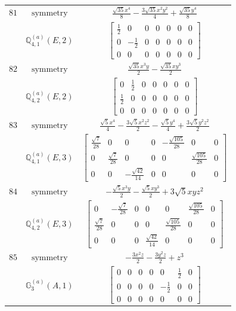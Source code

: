 \documentclass[fleqn,8pt,landscape]{jsarticle}
\begin{document}
\begin{longtable}{ccc}
$ 81 $ & $ \text{symmetry} $ & $ \frac{\sqrt{35} x^{4}}{8} - \frac{3 \sqrt{35} x^{2} y^{2}}{4} + \frac{\sqrt{35} y^{4}}{8} $ \\
$  $ & $ \mathbb{Q}_{4,1}^{(a)}(E,2) $ & $ \begin{bmatrix} \frac{1}{2} & 0 & 0 & 0 & 0 & 0 & 0 \\ 0 & - \frac{1}{2} & 0 & 0 & 0 & 0 & 0 \\ 0 & 0 & 0 & 0 & 0 & 0 & 0 \end{bmatrix} $ \\ \hline
$ 82 $ & $ \text{symmetry} $ & $ \frac{\sqrt{35} x^{3} y}{2} - \frac{\sqrt{35} x y^{3}}{2} $ \\
$  $ & $ \mathbb{Q}_{4,2}^{(a)}(E,2) $ & $ \begin{bmatrix} 0 & \frac{1}{2} & 0 & 0 & 0 & 0 & 0 \\ \frac{1}{2} & 0 & 0 & 0 & 0 & 0 & 0 \\ 0 & 0 & 0 & 0 & 0 & 0 & 0 \end{bmatrix} $ \\ \hline
$ 83 $ & $ \text{symmetry} $ & $ \frac{\sqrt{5} x^{4}}{4} - \frac{3 \sqrt{5} x^{2} z^{2}}{2} - \frac{\sqrt{5} y^{4}}{4} + \frac{3 \sqrt{5} y^{2} z^{2}}{2} $ \\
$  $ & $ \mathbb{Q}_{4,1}^{(a)}(E,3) $ & $ \begin{bmatrix} \frac{\sqrt{7}}{28} & 0 & 0 & 0 & - \frac{\sqrt{105}}{28} & 0 & 0 \\ 0 & \frac{\sqrt{7}}{28} & 0 & 0 & 0 & \frac{\sqrt{105}}{28} & 0 \\ 0 & 0 & - \frac{\sqrt{42}}{14} & 0 & 0 & 0 & 0 \end{bmatrix} $ \\ \hline
$ 84 $ & $ \text{symmetry} $ & $ - \frac{\sqrt{5} x^{3} y}{2} - \frac{\sqrt{5} x y^{3}}{2} + 3 \sqrt{5} x y z^{2} $ \\
$  $ & $ \mathbb{Q}_{4,2}^{(a)}(E,3) $ & $ \begin{bmatrix} 0 & - \frac{\sqrt{7}}{28} & 0 & 0 & 0 & \frac{\sqrt{105}}{28} & 0 \\ \frac{\sqrt{7}}{28} & 0 & 0 & 0 & \frac{\sqrt{105}}{28} & 0 & 0 \\ 0 & 0 & 0 & \frac{\sqrt{42}}{14} & 0 & 0 & 0 \end{bmatrix} $ \\ \hline
$ 85 $ & $ \text{symmetry} $ & $ - \frac{3 x^{2} z}{2} - \frac{3 y^{2} z}{2} + z^{3} $ \\
$  $ & $ \mathbb{G}_{3}^{(a)}(A,1) $ & $ \begin{bmatrix} 0 & 0 & 0 & 0 & 0 & \frac{1}{2} & 0 \\ 0 & 0 & 0 & 0 & - \frac{1}{2} & 0 & 0 \\ 0 & 0 & 0 & 0 & 0 & 0 & 0 \end{bmatrix} $ \\ \hline

\end{longtable}
\end{document}
